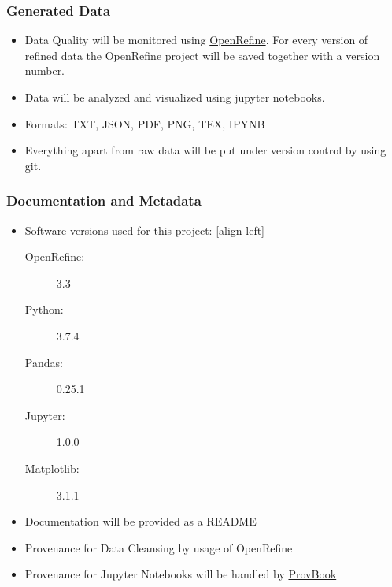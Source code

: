 \documentclass{beamer}
\begin{document}
\begin{frame}
\frametitle{Generated Data}
\begin{itemize}

\item Data Quality will be monitored using \href{https://openrefine.org/}{OpenRefine}. For every version of refined data the OpenRefine project will be saved together with a version number.
\vfill
\item Data will be analyzed and visualized using jupyter notebooks. 
\vfill
\item Formats: TXT, JSON, PDF, PNG, TEX, IPYNB
\vfill
\item Everything apart from raw data will be put under version control by using git.
\end{itemize}
\end{frame}

\begin{frame}
\frametitle{Documentation and Metadata}
\begin{itemize}
\item Software versions used for this project:
[align left]
\begin{description}
\item[OpenRefine:] 3.3
\item[Python: ] 3.7.4
\item[Pandas: ] 0.25.1
\item[Jupyter: ] 1.0.0
\item[Matplotlib: ] 3.1.1
\end{description}
\vfill
\item Documentation will be provided as a README
\vfill
\item Provenance for Data Cleansing by usage of OpenRefine
\vfill
\item Provenance for Jupyter Notebooks will be handled by \href{https://github.com/Sheeba-Samuel/ProvBook}{ProvBook}
\end{itemize}
\end{frame}
\end{document}
